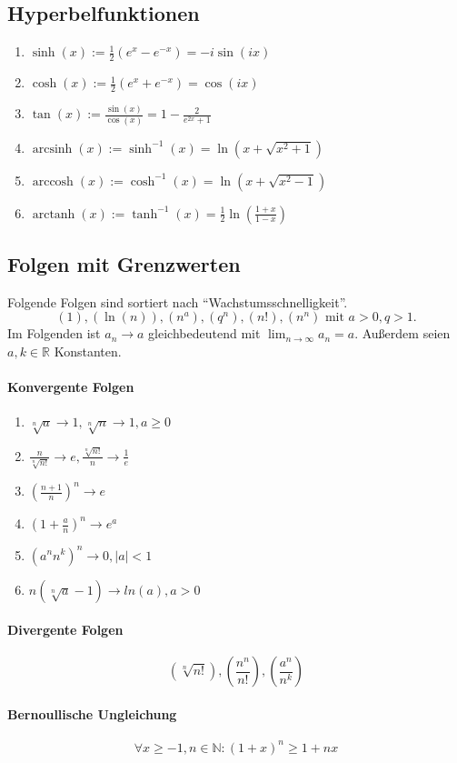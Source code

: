 \documentclass[a4paper, 9pt, DIV=24]{scrartcl}
\DeclareMathOperator{\arcsinh}{arcsinh}
\DeclareMathOperator{\arccosh}{arccosh}
\DeclareMathOperator{\arctanh}{arctanh}
\newcommand{\N}{\mathbb{N}}
\begin{document}
\subsection{Hyperbelfunktionen}
\begin{enumerate}[label={(}\arabic*{)}]
 \item $\sinh(x) := \frac{1}{2}(e^x-e^{-x}) = -i\sin(ix)$
 \item $\cosh(x) := \frac{1}{2}(e^x+e^{-x}) = \cos(ix)$
 \item $\tan(x) := \frac{\sin(x)}{\cos(x)} = 1 - \frac{2}{e^{2x}+1}$
 \item $\arcsinh(x) := \sinh^{-1}(x) = \ln(x + \sqrt{x^2+1})$
 \item $\arccosh(x) := \cosh^{-1}(x) = \ln(x + \sqrt{x^2-1})$
 \item $\arctanh(x) := \tanh^{-1}(x) = \frac{1}{2}\ln(\frac{1+x}{1-x})$
\end{enumerate}

\subsection{Folgen mit Grenzwerten}
Folgende Folgen sind sortiert nach ``Wachstumsschnelligkeit''.
\[ (1), (\ln(n)), (n^{a}), (q^n), (n!), (n^n) \text{ mit } a > 0, q > 1.\]
Im Folgenden ist $a_n \to a$ gleichbedeutend mit $\lim_{n\to\infty} a_n = a$.
Außerdem seien $a,k\in\mathbb{R}$ Konstanten.
\paragraph{Konvergente Folgen}
\begin{enumerate}[label={(}\arabic*{)}]
 \item $\sqrt[n]{a} \to 1, \sqrt[n]{n} \to 1, a \geq 0$
 \item $\frac{n}{\sqrt[n]{n!}} \to e, \frac{\sqrt[n]{n!}}{n} \to \frac{1}{e}$
 \item $(\frac{n+1}{n})^n \to e$
 \item $(1 + \frac{a}{n})^n \to e^a$
 \item $(a^nn^k)^n \to 0, |a| < 1$
 \item $n(\sqrt[n]{a}-1) \to ln(a), a > 0$
\end{enumerate}
\paragraph{Divergente Folgen}
\[ (\sqrt[n]{n!}), (\frac{n^n}{n!}), (\frac{a^n}{n^k}) \]
\paragraph{Bernoullische Ungleichung}
\[ \forall x\geq -1, n\in\N: (1+x)^n \geq 1 + nx \]
\end{document}

